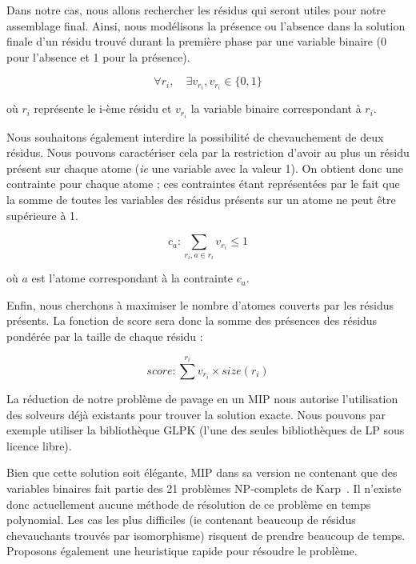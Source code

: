 Dans notre cas, nous allons rechercher les résidus qui seront utiles pour notre assemblage final.
Ainsi, nous modélisons la présence ou l'absence dans la solution finale d'un résidu trouvé durant la première phase par une
variable binaire (0 pour l'absence et 1 pour la présence).

\begin{equation}
 \forall r_i, \quad \exists v_{r_i}, v_{r_i} \in \{0, 1\}
\end{equation}

où $r_i$ représente le i-ème résidu et $v_{r_i}$ la variable binaire correspondant à $r_i$.

Nous souhaitons également interdire la possibilité de chevauchement de deux résidus.
Nous pouvons caractériser cela par la restriction d'avoir au plus un résidu présent sur chaque atome (\textit{ie} une variable avec la valeur 1).
On obtient donc une contrainte pour chaque atome ; ces contraintes étant représentées par le fait que la somme de toutes les variables des résidus présents sur un atome ne peut être supérieure à 1.

\begin{equation}
 c_a : \sum_{r_i, a \in r_i} v_{r_i} \leqslant 1
\end{equation}

où $a$ est l'atome correspondant à la contrainte $c_a$.

Enfin, nous cherchons à maximiser le nombre d'atomes couverts par les résidus présents. La fonction de score sera
donc la somme des présences des résidus pondérée par la taille de chaque résidu :

\begin{equation}
 score : \sum^{r_i} v_{r_i} \times size(r_i)
\end{equation}

La réduction de notre problème de pavage en un MIP nous autorise l'utilisation des solveurs déjà existants pour trouver la solution exacte.
Nous pouvons par exemple utiliser la bibliothèque GLPK (l'une des seules bibliothèques de LP sous licence libre).

Bien que cette solution soit élégante, MIP dans sa version ne contenant que des variables binaires fait partie des 21 problèmes NP-complets de Karp~\cite{karp_reducibility_1972}.
Il n'existe donc actuellement aucune méthode de résolution de ce problème en temps polynomial.
Les cas les plus difficiles (ie contenant beaucoup de résidus chevauchants trouvés par isomorphisme) risquent de prendre beaucoup de temps.
Proposons également une heuristique rapide pour résoudre le problème.



